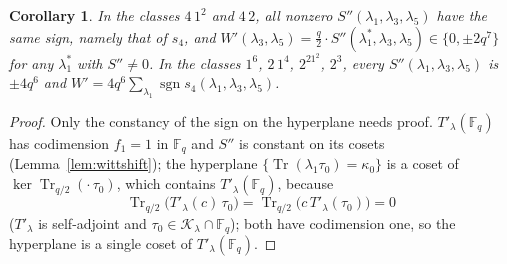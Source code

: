 \documentclass[12pt,a4paper]{amsart}
\newtheorem{corollary}[theorem]{Corollary}
\theoremstyle{definition}
\newcommand{\F}{\mathbb{F}}
\newcommand{\Tr}{\operatorname{Tr}}
\newcommand{\Kk}{\mathcal{K}}
\newcommand{\Spp}{S''}
\begin{document}
\begin{corollary}\label{cor:order4}
In the classes $4\,1^2$ and $4\,2$, all nonzero $\Spp(\lambda_1,\lambda_3,\lambda_5)$ have the same sign, namely that of $s_4$, and $W'(\lambda_3,\lambda_5)=\frac q2\cdot\Spp(\lambda_1^*,\lambda_3,\lambda_5)\in\{0,\pm2q^7\}$ for any $\lambda_1^*$ with $\Spp\ne0$. In the classes $1^6$, $2\,1^4$, $2^21^2$, $2^3$, every $\Spp(\lambda_1,\lambda_3,\lambda_5)$ is $\pm4q^6$ and $W'=4q^6\sum_{\lambda_1}\operatorname{sgn}s_4(\lambda_1,\lambda_3,\lambda_5)$.
\end{corollary}
\begin{proof}
Only the constancy of the sign on the hyperplane needs proof. $T'_\lambda(\F_q)$ has codimension $f_1=1$ in $\F_q$ and $\Spp$ is constant on its cosets (Lemma~\ref{lem:wittshift}); the hyperplane $\{\Tr(\lambda_1\tau_0)=\kappa_0\}$ is a coset of $\ker\Tr_{q/2}(\cdot\,\tau_0)$, which contains $T'_\lambda(\F_q)$, because
\[
\Tr_{q/2}\bigl(T'_\lambda(c)\,\tau_0\bigr)=\Tr_{q/2}\bigl(c\,T'_\lambda(\tau_0)\bigr)=0
\]
($T'_\lambda$ is self-adjoint and $\tau_0\in\Kk_\lambda\cap\F_q$); both have codimension one, so the hyperplane is a single coset of $T'_\lambda(\F_q)$.
\end{proof}
\end{document}
